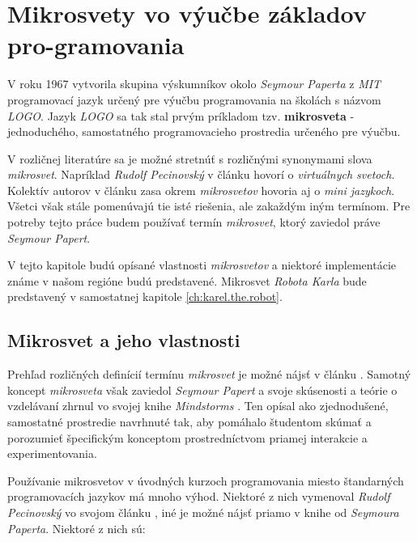 
\chapter{Mikrosvety vo výučbe základov pro-gramovania}\label{ch:microworlds}

V roku 1967 vytvorila skupina výskumníkov okolo \emph{Seymour Paperta} z \emph{MIT} programovací jazyk určený pre výučbu programovania na školách s názvom \emph{LOGO}. Jazyk \emph{LOGO} sa tak stal prvým príkladom tzv. \textbf{mikrosveta} - jednoduchého, samostatného programovacieho prostredia určeného pre výučbu.

V rozličnej literatúre sa je možné stretnúť s rozličnými synonymami slova \emph{mikrosvet}. Napríklad \emph{Rudolf Pecinovský} v článku \cite{Pecinovsky2001} hovorí o \emph{virtuálnych svetoch}. Kolektív autorov v článku \cite{Brusilovsky} zasa okrem \emph{mikrosvetov} hovoria aj o \emph{mini jazykoch}. Všetci však stále pomenúvajú tie isté riešenia, ale zakaždým iným termínom. Pre potreby tejto práce budem používať termín \emph{mikrosvet}, ktorý zaviedol práve \emph{Seymour Papert}.

V tejto kapitole budú opísané vlastnosti \emph{mikrosvetov} a niektoré implementácie známe v našom regióne budú predstavené. Mikrosvet \emph{Robota Karla} bude predstavený v samostatnej kapitole \ref{ch:karel.the.robot}.


\section{Mikrosvet a jeho vlastnosti}

Prehľad rozličných definícií termínu \emph{mikrosvet} je možné nájsť v článku \cite{djelil:hal-02438255}. Samotný koncept \emph{mikrosveta} však zaviedol \emph{Seymour Papert} a svoje skúsenosti a teórie o vzdelávaní zhrnul vo svojej knihe \emph{Mindstorms} \cite{Papert1980}. Ten opísal  ako zjednodušené, samostatné prostredie navrhnuté tak, aby pomáhalo študentom skúmať a porozumieť špecifickým konceptom prostredníctvom priamej interakcie a experimentovania.

Používanie mikrosvetov v úvodných kurzoch programovania miesto štandarných programovacích jazykov má mnoho výhod. Niektoré z nich vymenoval \emph{Rudolf Pecinovský} vo svojom článku \cite{Pecinovsky2001}, iné je možné nájsť priamo  v knihe \cite{Papert1980} od \emph{Seymoura Paperta}. Niektoré z nich sú:


